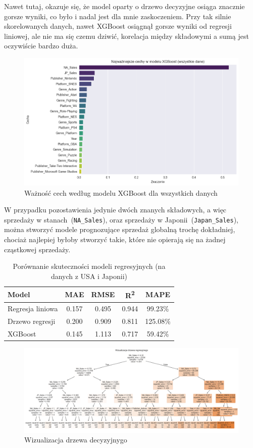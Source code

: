 \documentclass[11pt]{article}
\begin{document}
Nawet tutaj, okazuje się, że model oparty o drzewo decyzyjne osiąga znacznie gorsze wyniki,
co było i nadal jest dla mnie zaskoczeniem.
Przy tak silnie skorelowanych danych, nawet XGBoost osiągnął gorsze wyniki od regresji liniowej,
ale nie ma się czemu dziwić, korelacja między składowymi a sumą jest oczywiście bardzo duża.

\begin{figure}[H]
    \centering
    \includegraphics[width=0.9\linewidth]{figures/xgboost-all}
    \caption{Ważność cech według modelu XGBoost dla wszystkich danych}
    \label{fig:xgb_importance2}
\end{figure}

W przypadku pozostawienia jedynie dwóch znanych składowych, a więc sprzedaży w stanach~(\texttt{NA\_Sales}),
oraz sprzedaży w Japonii~(\texttt{Japan\_Sales}),
można stworzyć modele prognozujące sprzedaż globalną trochę dokładniej, chociaż najlepiej byłoby stworzyć takie,
które nie opierają się na żadnej cząstkowej sprzedaży.

\begin{table}[H]
\centering
\begin{tabular}{|l|c|c|c|c|}
\hline
\textbf{Model} & \textbf{MAE} & \textbf{RMSE} & \textbf{R\textsuperscript{2}} & \textbf{MAPE} \\
\hline
Regresja liniowa & 0.157 & 0.495 & 0.944 & 99.23\% \\
Drzewo regresji  & 0.200 & 0.909 & 0.811 & 125.08\% \\
XGBoost          & 0.145 & 1.113 & 0.717 & 59.42\% \\
\hline
\end{tabular}
\caption{Porównanie skuteczności modeli regresyjnych (na danych z USA i Japonii)}
\label{tab:model_comparison3}
\end{table}

\begin{figure}[H]
    \centering
    \includegraphics[width=0.9\linewidth]{figures/tree-last}
    \caption{Wizualizacja drzewa decyzyjnygo}
    \label{fig:tree-last}
\end{figure}
\end{document}
